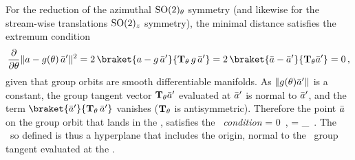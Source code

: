 \documentclass{jfm}
\begin{document}
For the reduction of the azimuthal
$\textrm{SO}(2)_\theta$ symmetry (and likewise for the stream-wise translations
$\textrm{SO}(2)_z$ symmetry), the minimal distance satisfies the extremum
condition
\[
\frac{\partial}{\partial \gSpace} \Norm{\ssp - \LieEl(\gSpace)\,\slicep}^2
   =
2\, \braket{\ssp - \LieEl\,\slicep}{\Lg_\gSpace \,\LieEl\,\slicep}
   =
2\, \braket{\sspRed - \slicep}{\Lg_\gSpace \slicep}
   = 0
    \, ,
\]
given that group orbits are smooth differentiable manifolds.
As $\|{g({\bf \theta})\bar{a}'}\|$ is a constant,
the group tangent vector $\mathbf{T}_{{\bf \theta}} \bar{a}'$
evaluated at $\bar{a}'$
is normal to $\bar{a}'$, and
the term $\braket{\slicep}{\Lg_\theta\,\slicep}$ vanishes
($\mathbf{T}_{\theta}$ is antisymmetric).
Therefore the point $\bar{a}$ on the group
orbit that lands in the \slice, satisfies the \emph{\slice\ condition}
\beq
\braket{\sspRed}{\sliceTan{\theta}} = 0
    \,,\quad
\sliceTan{\theta} = \Lg_\theta \slicep
    \,.
The \slice\ so defined is thus a hyperplane that includes the origin,
normal to the \template\ group tangent %
evaluated at the \template.

\end{document}
